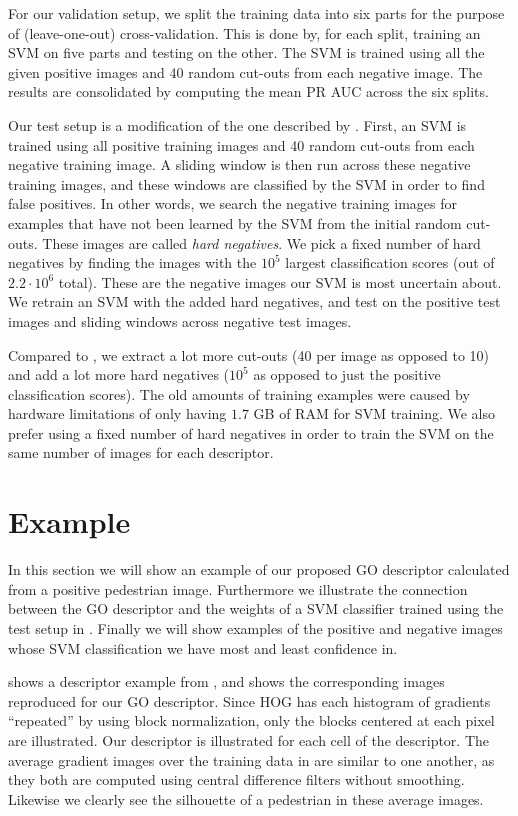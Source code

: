 \documentclass[thesis.tex]{subfiles}
\begin{document}
For our validation setup, we split the training data into six parts for the purpose of (leave-one-out) cross-validation. This is done by, for each split, training an SVM on five parts and testing on the other. The SVM is trained using all the given positive images and 40 random cut-outs from each negative image. The results are consolidated by computing the mean PR AUC across the six splits.

Our test setup is a modification of the one described by \citet{dalal2005histograms}. First, an SVM is trained using all positive training images and 40 random cut-outs from each negative training image. A sliding window is then run across these negative training images, and these windows are classified by the SVM in order to find false positives. In other words, we search the negative training images for examples that have not been learned by the SVM from the initial random cut-outs. These images are called \emph{hard negatives}. We pick a fixed number of hard negatives by finding the images with the $10^5$ largest classification scores (out of $2.2 \cdot 10^6$ total). These are the negative images our SVM is most uncertain about. We retrain an SVM with the added hard negatives, and test on the positive test images and sliding windows across negative test images.

Compared to \citet{dalal2005histograms}, we extract a lot more cut-outs (40 per image as opposed to 10) and add a lot more hard negatives ($10^5$ as opposed to just the positive classification scores). The old amounts of training examples were caused by hardware limitations of only having $1.7$ GB of RAM for SVM training. We also prefer using a fixed number of hard negatives in order to train the SVM on the same number of images for each descriptor.

\section{Example}
%
In this section we will show an example of our proposed GO descriptor calculated from a positive pedestrian image. Furthermore we illustrate the connection between the GO descriptor and the weights of a SVM classifier trained using the test setup in .
Finally we will show examples of the positive and negative images whose SVM classification we have most and least confidence in.

 shows a descriptor example from \citet{dalal2005histograms}, and  shows the corresponding images reproduced for our GO descriptor. Since HOG has each histogram of gradients ``repeated'' by using block normalization, only the blocks centered at each pixel are illustrated. Our descriptor is illustrated for each cell of the descriptor. The average gradient images over the training data in  are similar to one another, as they both are computed using central difference filters without smoothing. Likewise we clearly see the silhouette of a pedestrian in these average images.
\end{document}
